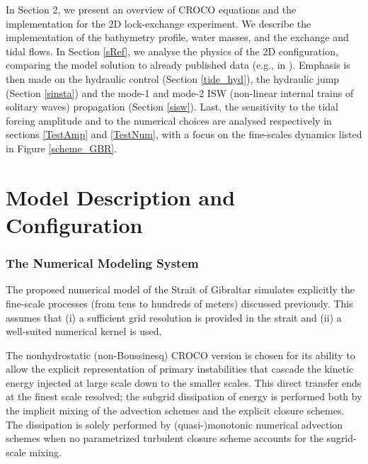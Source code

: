 In Section 2, we present an overview of CROCO equations and the implementation for the 2D lock-exchange experiment. We describe the implementation of the bathymetry profile, water masses, and the exchange and tidal flows. In Section \ref{sRef}, we analyse the physics of the 2D configuration, comparing the model solution to already published data  (e.g., in \citet{FA1988}). Emphasis is then made on the hydraulic control (Section \ref{tide_hyd}), the hydraulic jump (Section \ref{sinsta}) and the mode-1 and mode-2 ISW (non-linear internal trains of solitary waves) propagation (Section \ref{sisw}). Last, the sensitivity to the tidal forcing amplitude and to the numerical choices are analysed respectively in sections \ref{TestAmp} and \ref{TestNum}, with a focus on the fine-scales dynamics listed in Figure \ref{scheme_GBR}. 

\section{Model Description and Configuration}

\subsubsection{The Numerical Modeling System}

The proposed numerical model of the Strait of Gibraltar simulates explicitly the fine-scale processes (from tens to hundreds of meters) discussed previously. This assumes that (i) a sufficient grid resolution is provided in the strait and (ii) a well-suited numerical kernel is used.

The nonhydrostatic (non-Boussinesq) CROCO version is chosen for its ability to allow the explicit representation of primary instabilities that cascade the kinetic energy injected at large scale down to the smaller scales. This direct transfer ends at the finest scale resolved; the subgrid dissipation of energy is performed both by the implicit mixing of the advection schemes and the explicit closure schemes. The dissipation is solely performed by (quasi-)monotonic numerical advection schemes \citep{Grinstein2007}  when no parametrized turbulent closure scheme accounts for the sugrid-scale mixing.

